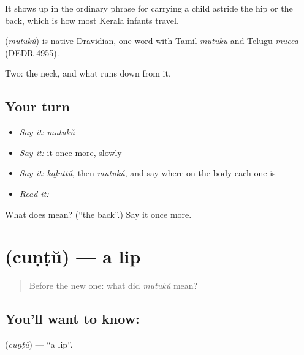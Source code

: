 It shows up in the ordinary phrase for carrying a child astride the hip or the back, which is how most Kerala infants travel.

\begin{cousinweb}
\textbf{} (\emph{mutukŭ}) is native Dravidian, one word with Tamil \emph{mutuku} and Telugu \emph{mucca} (DEDR 4955).
\end{cousinweb}

\begin{grammarlens}[title={What you've built}]
Two: the neck, and what runs down from it.
\end{grammarlens}

\subsection*{Your turn}
\begin{itemize}
\raggedright
  \item \emph{Say it:} \emph{mutukŭ}
  \item \emph{Say it:} it once more, slowly
  \item \emph{Say it:} \emph{kaḻuttŭ}, then \emph{mutukŭ}, and say where on the body each one is
  \item \emph{Read it:} \textbf{}
\end{itemize}

\begin{tcolorbox}[breakable,colback=teal!4,colframe=teal!35!black,title={Before you move on}]
What does  mean? (\textquotedblleft{}the back\textquotedblright{}.) Say it once more.
\end{tcolorbox}
\section[\texorpdfstring{\ml{ചുണ്ട്} (cuṇṭŭ)}{ചുണ്ട് (cuṇṭŭ)}]{ (cuṇṭŭ) — a lip}

\label{lesson:ML-C57-lip}



\begin{quote}
Before the new one: what did \emph{mutukŭ} mean?
\end{quote}

\subsection*{You'll want to know: }
\textbf{} (\emph{cuṇṭŭ}) — \textquotedblleft{}a lip\textquotedblright{}.

